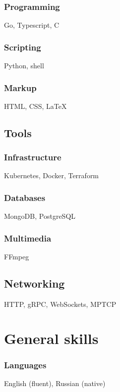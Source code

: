 \documentclass[a4paper,11pt]{article}
\begin{document}
\subsubsection{Programming}
Go, Typescript, C

\subsubsection{Scripting}
Python, shell

\subsubsection{Markup}
HTML, CSS, {\LaTeX}


\subsection{Tools}

\subsubsection{Infrastructure}
Kubernetes, Docker, Terraform

\subsubsection{Databases}
MongoDB, PostgreSQL

\subsubsection{Multimedia}
FFmpeg

\subsection{Networking}
HTTP, gRPC, WebSockets, MPTCP

\section{General skills}

\subsubsection{Languages}
English (fluent), Russian (native)
\end{document}
